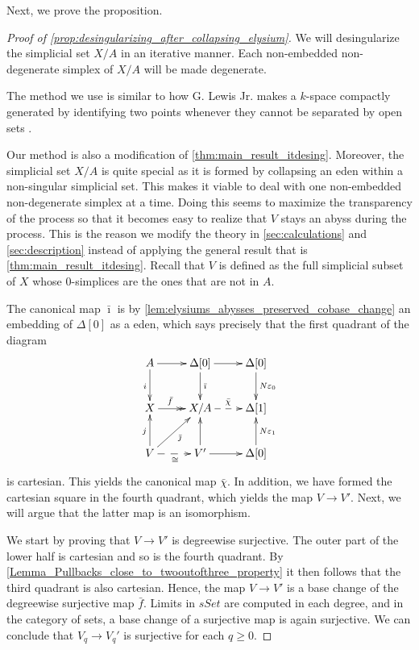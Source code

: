 Next, we prove the proposition.
\begin{proof}[Proof of \cref{prop:desingularizing_after_collapsing_elysium}]
We will desingularize the simplicial set $X/A$ in an iterative manner. Each non-embedded non-degenerate simplex of $X/A$ will be made degenerate.

The method we use is similar to how G. Lewis Jr. makes a $k$-space compactly generated by identifying two points whenever they cannot be separated by open sets \cite[p.~158]{Le78}.

Our method is also a modification of \cref{thm:main_result_itdesing}. Moreover, the simplicial set $X/A$ is quite special as it is formed by collapsing an eden within a non-singular simplicial set. This makes it viable to deal with one non-embedded non-degenerate simplex at a time. Doing this seems to maximize the transparency of the process so that it becomes easy to realize that $V$ stays an abyss during the process. This is the reason we modify the theory in \cref{sec:calculations} and \cref{sec:description} instead of applying the general result that is \cref{thm:main_result_itdesing}. Recall that $V$ is defined as the full simplicial subset of $X$ whose $0$-simplices are the ones that are not in $A$.

The canonical map $\bar{\imath }$ is by \cref{lem:elysiums_abysses_preserved_cobase_change} an embedding of $\Delta [0]$ as a eden, which says precisely that the first quadrant of the diagram
\begin{displaymath}
 \xymatrix{
  A \ar[d]_i \ar[r] & \Delta [0] \ar[d]^{\bar{\imath } } \ar[r] & \Delta [0] \ar[d]^{N\varepsilon _0} \\
  X \ar@{->>}[r]^(.4){\bar{f} } & X/A \ar@{-->}[r]^{\bar{\chi } } & \Delta [1] \\
  V \ar[u]^j \ar@{-->}[r]_\cong \ar[ur]_{\bar{\jmath } } & V' \ar[u] \ar[r] & \Delta [0] \ar[u]_{N\varepsilon _1}
 }
\end{displaymath}
is cartesian. This yields the canonical map $\bar{\chi }$. In addition, we have formed the cartesian square in the fourth quadrant, which yields the map $V\to V'$. Next, we will argue that the latter map is an isomorphism.

We start by proving that $V\to V'$ is degreewise surjective. The outer part of the lower half is cartesian and so is the fourth quadrant. By \cref{Lemma_Pullbacks_close_to_twooutofthree_property} it then follows that the third quadrant is also cartesian. Hence, the map $V\to V'$ is a base change of the degreewise surjective map $\bar{f}$. Limits in $sSet$ are computed in each degree, and in the category of sets, a base change of a surjective map is again surjective. We can conclude that $V_q\to V_q'$ is surjective
for each $q\geq 0$.


\end{proof}
